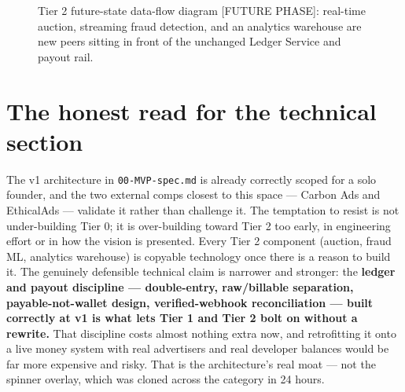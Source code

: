 \begin{figure}[htbp]
\caption{Tier 2 future-state data-flow diagram [FUTURE PHASE]: real-time auction, streaming fraud detection, and an analytics warehouse are new peers sitting in front of the unchanged Ledger Service and payout rail.}
\label{fig:tier2-dataflow}
\end{figure}

\section{The honest read for the technical section}
\label{sec:honest-read}

The v1 architecture in \texttt{00-MVP-spec.md} is already correctly scoped for a solo founder, and the two external comps closest to this space --- Carbon Ads and EthicalAds --- validate it rather than challenge it. The temptation to resist is not under-building Tier 0; it is over-building toward Tier 2 too early, in engineering effort or in how the vision is presented. Every Tier 2 component (auction, fraud ML, analytics warehouse) is copyable technology once there is a reason to build it. The genuinely defensible technical claim is narrower and stronger: the \textbf{ledger and payout discipline --- double-entry, raw/billable separation, payable-not-wallet design, verified-webhook reconciliation --- built correctly at v1 is what lets Tier 1 and Tier 2 bolt on without a rewrite.} That discipline costs almost nothing extra now, and retrofitting it onto a live money system with real advertisers and real developer balances would be far more expensive and risky. That is the architecture's real moat --- not the spinner overlay, which was cloned across the category in 24 hours.
